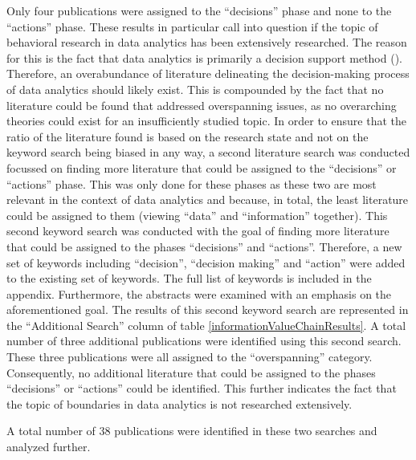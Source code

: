 Only four publications were assigned to the \enquote{decisions} phase and none to the \enquote{actions} phase. These results in particular call into question if the topic of behavioral research in data analytics has been extensively researched. The reason for this is the fact that data analytics is primarily a decision support method (\cite{Runkler.2020}). Therefore, an overabundance of literature delineating the decision-making process of data analytics should likely exist. This is compounded by the fact that no literature could be found that addressed overspanning issues, as no overarching theories could exist for an insufficiently studied topic. In order to ensure that the ratio of the literature found is based on the research state and not on the keyword search being biased in any way, a second literature search was conducted focussed on finding more literature that could be assigned to the \enquote{decisions} or \enquote{actions} phase. This was only done for these phases as these two are most relevant in the context of data analytics and because, in total, the least literature could be assigned to them (viewing \enquote{data} and  \enquote{information} together). This second keyword search was conducted with the goal of finding more literature that could be assigned to the phases \enquote{decisions} and \enquote{actions}. Therefore, a new set of keywords including \enquote{decision}, \enquote{decision making} and \enquote{action} were added to the existing set of keywords. The full list of keywords is included in the appendix. Furthermore, the abstracts were examined with an emphasis on the aforementioned goal. The results of this second keyword search are represented in the \enquote{Additional Search} column of table \ref{informationValueChainResults}. A total number of three additional publications were identified using this second search. These three publications were all assigned to the \enquote{overspanning} category. Consequently, no additional literature that could be assigned to the phases \enquote{decisions} or \enquote{actions} could be identified. This further indicates the fact that the topic of boundaries in data analytics is not researched extensively. 

A total number of 38 publications were identified in these two searches and analyzed further.


